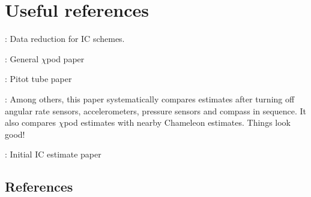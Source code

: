 \chapter{Useful references}
\cite{Becherer2017} : Data reduction for IC schemes.

\cite{Moum2009a} : General $\chi$pod paper

\cite{Moum2015} : Pitot tube paper

\cite{Perlin2012} : Among others, this paper systematically compares estimates after turning off angular rate sensors, accelerometers, pressure sensors and compass in sequence. It also compares $\chi$pod estimates with nearby Chameleon estimates. Things look good!

\cite{Zhang2010a} : Initial IC estimate paper

\section*{References}

\renewcommand{\bibsection}{}



